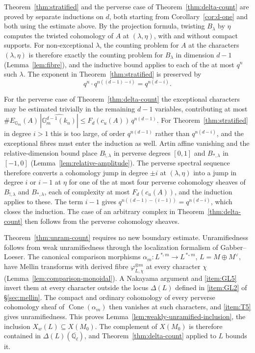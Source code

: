 \documentclass[12pt,reqno]{amsart}
\theoremstyle{definition}
\theoremstyle{plain}
\theoremstyle{definition}
\theoremstyle{remark}
\newcommand{\bbG}{\mathbb{G}}  \newcommand{\bbH}{\mathbb{H}}
\newcommand{\bbQ}{\mathbb{Q}}  \newcommand{\bbR}{\mathbb{R}}
\newcommand{\ol}[1]{\overline{#1}}
\newcommand{\Ql}{\bbQ_{\ell}}
\newcommand{\Gm}{\bbG_m}
\newcommand{\cu}{c_u}
\newcommand{\Cone}{\operatorname{Cone}}
\begin{document}
Theorem~\ref{thm:stratified} and the perverse case of Theorem~\ref{thm:delta-count} are proved by
separate inductions on \(d\), both starting from Corollary~\ref{cor:d-one} and both using the estimate
above.  By the projection formula, twisting \(B_\lambda\) by \(\eta\)
computes the twisted cohomology of \(A\) at \((\lambda,\eta)\), with and without compact supports.
For non-exceptional \(\lambda\), the counting problem for \(A\) at the characters \((\lambda,\eta)\)
is therefore exactly the counting problem for \(B_\lambda\) in dimension \(d-1\)
(Lemma~\ref{lem:fibre}), and the inductive bound applies to each of the at most \(q^n\) such
\(\lambda\).  The exponent in Theorem~\ref{thm:stratified} is preserved by
\[
        q^n\cdot q^{n((d-1)-i)}=q^{n(d-i)}.
\]

For the perverse case of Theorem~\ref{thm:delta-count} the exceptional characters may be estimated
trivially in the remaining \(d-1\) variables, contributing at most
\(\#E_{\Gm}(A)\,|\widehat{\Gm^{d-1}(k_n)}|\le F_d(\cu(A))\,q^{n(d-1)}\).  For
Theorem~\ref{thm:stratified} in degree \(i>1\) this is too large, of order \(q^{n(d-1)}\) rather than
\(q^{n(d-i)}\), and the exceptional fibres must enter the induction as well.  Artin affine vanishing
and the relative-dimension bound place \(B_{!,\lambda}\) in perverse degrees \([0,1]\) and
\(B_{*,\lambda}\) in \([-1,0]\) (Lemma~\ref{lem:relative-amplitude}).  The perverse spectral sequence
therefore converts a cohomology jump in degree \(\pm i\) at \((\lambda,\eta)\) into a jump in degree
\(i\) or \(i-1\) at \(\eta\) for one of the at most four perverse cohomology sheaves of
\(B_{!,\lambda}\) and \(B_{*,\lambda}\), each of complexity at most \(F_d(\cu(A))\), and the
induction applies to these.  The term \(i-1\) gives \(q^{n((d-1)-(i-1))}=q^{n(d-i)}\), which closes
the induction.  The case of an arbitrary complex in Theorem~\ref{thm:delta-count} then follows from
the perverse cohomology sheaves.

Theorem~\ref{thm:unram-count} requires no new boundary estimate.  Unramifiedness follows from weak
unramifiedness through the localization formalism of Gabber--Loeser.  The canonical comparison
morphisms \(\alpha_m\colon L^{\ast_!m}\to L^{\ast_*m}\), \(L=M\oplus M^\vee\), have Mellin transforms
with derived fibre \(\varphi_{L,\chi}^{\otimes m}\) at every character \(\chi\)
(Lemma~\ref{lem:comparison-monoidal}).  A Nakayama argument and \ref{item:GL5} invert them at every
character outside the locus \(\Delta(L)\) defined in \ref{item:GL2} of \S\ref{sec:mellin}.  The
compact and ordinary cohomology of every perverse cohomology sheaf of \(\Cone(\alpha_m)\) then
vanishes at such characters, and \ref{item:T5} gives unramifiedness.  This proves
Lemma~\ref{lem:weakly-unramified-inclusion}, the inclusion \(X_w(L)\subseteq X(M_0)\).  The
complement of \(X(M_0)\) is therefore contained in \(\Delta(L)(\ol\Ql)\), and
Theorem~\ref{thm:delta-count} applied to \(L\) bounds it.
\end{document}
